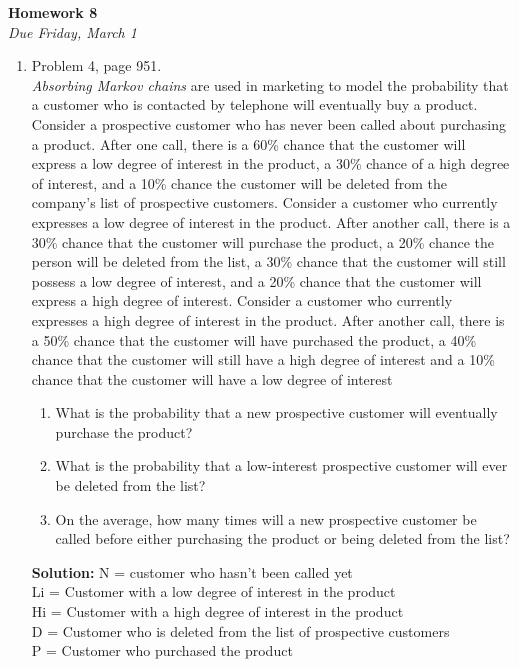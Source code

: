 \documentclass[oneside,12pt]{memoir}
\begin{document}
\begin{center}
\textbf{\large Homework 8} \\
\emph{Due Friday, March 1}
\end{center}

\begin{enumerate}[leftmargin=*]

\item Problem 4, page 951.\\
\emph{Absorbing Markov chains} are used in marketing to model the probability that a customer who is contacted by telephone will eventually buy a product. Consider a prospective customer who has never been called about purchasing a product. After one call, there is a 60\% chance that the customer will express a low degree of interest in the product, a 30\% chance of a high degree of interest, and a 10\% chance the customer will be deleted from the company’s list of prospective customers. Consider a customer who currently expresses a low degree of interest in the product. After another call, there is a 30\% chance that the customer will purchase the product, a 20\% chance the person will be deleted from the list, a 30\% chance that the customer will still possess a low degree of interest, and a 20\% chance that the customer will express a high degree of interest. Consider a customer who currently expresses a high degree of interest in the product. After another call, there is a 50\% chance that the customer will have purchased the product, a 40\% chance that the customer will still have a high degree of interest and a 10\% chance that the customer will have a low degree of interest\\
        \begin{enumerate}
		\item What is the probability that a new prospective customer will eventually purchase the product? 
		\item What is the probability that a low-interest prospective customer will ever be deleted from the list? 
		\item On the average, how many times will a new prospective customer be called before either purchasing the product or being deleted from the list?
\end{enumerate}
\textbf{Solution:}  
N = customer who hasn’t been called yet\\
Li = Customer with a low degree of interest in the product\\
Hi = Customer with a high degree of interest in the product\\
D = Customer who is deleted from the list of prospective customers\\
P = Customer who purchased the product\\


\end{enumerate}
\end{document}
